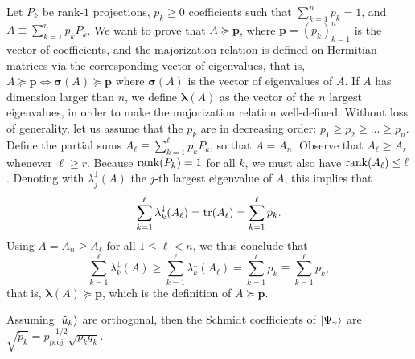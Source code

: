 \documentclass[
	aps, pra,
	superscriptaddress, twocolumn,
	floatfix,
	10pt
]{revtex4-1}
\newcommand{\bs}[1]{\boldsymbol{#1}}
\newcommand{\on}[1]{\operatorname{#1}}
\newcommand{\parTitle}[1]{\noindent{\color{Mahogany}(\emph{#1})}}
\renewcommand{\parTitle}[1]{}
\begin{document}
\parTitle{Proof to possibly move to appendix or something}
Let $P_k$ be rank-$1$ projections, $p_k\ge0$ coefficients such that $\sum_{k=1}^n p_k=1$, and
$A\equiv \sum_{k=1}^n p_k P_k$. We want to prove that $A\succeq \bs p$,
where $\bs p=(p_k)_{k=1}^n$ is the vector of coefficients, and the majorization relation is defined on Hermitian matrices via the corresponding vector of eigenvalues, that is,
$A\succeq\bs p\Longleftrightarrow \bs\sigma(A)\succeq\bs p$ where $\bs\sigma(A)$ is the vector of eigenvalues of $A$. If $A$ has dimension larger than $n$, we define $\bs\lambda(A)$ as the vector of the $n$ largest eigenvalues, in order to make the majorization relation well-defined.
Without loss of generality, let us assume that the $p_k$ are in decreasing order: $p_1 \ge p_2 \ge ...\ge p_n$.
Define the partial sums $A_\ell\equiv \sum_{k=1}^\ell p_k P_k$, so that $A=A_n$.
Observe that $A_\ell \ge A_r$ whenever $\ell\ge r$.
Because $\rank(P_k)=1$ for all $k$, we must also have $\rank(A_\ell)\le \ell$.
Denoting with $\lambda_j^\downarrow(A)$ the $j$-th largest eigenvalue of $A$, this implies that
\begin{equation}
    \sum_{k=1}^\ell \lambda_k^\downarrow(A_\ell) = \tr(A_\ell)
    = \sum_{k=1}^\ell p_k.
\end{equation}
Using $A=A_n\ge A_\ell$ for all $1\le \ell< n$, we thus conclude that
\begin{equation}
    \sum_{k=1}^\ell \lambda_k^\downarrow(A) \ge 
    \sum_{k=1}^\ell \lambda_k^\downarrow(A_\ell)
    = \sum_{k=1}^\ell p_k \equiv \sum_{k=1}^\ell p_k^\downarrow,
\end{equation}
that is, $\bs\lambda(A)\succeq \bs p$, which is the definition of $A\succeq \bs p$.

\parTitle{Entanglement degradation for different probabilities}
Assuming $\ket{\tilde u_k}$ are orthogonal, then the Schmidt coefficients of $\ket{\Psi_\gamma}$ are $\sqrt{\tilde p_k}=p^{-1/2}_{\on{proj}}\sqrt{p_k q_k}$.
\end{document}
